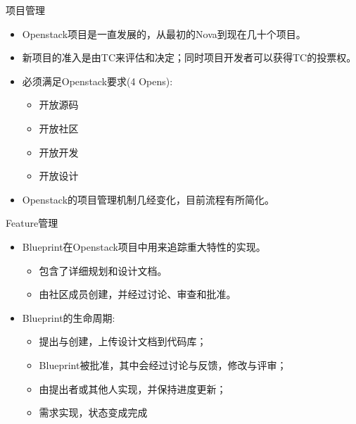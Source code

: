 \documentclass{beamer}
\begin{document}
\begin{frame}[label={sec:org45f7cc4}]{项目管理}
\begin{itemize}
\item Openstack项目是一直发展的，从最初的Nova到现在几十个项目。
\item 新项目的准入是由TC来评估和决定；同时项目开发者可以获得TC的投票权。
\item 必须满足Openstack要求(4 Opens):
\begin{itemize}
\item 开放源码
\item 开放社区
\item 开放开发
\item 开放设计
\end{itemize}
\item Openstack的项目管理机制几经变化，目前流程有所简化。
\end{itemize}
\end{frame}

\begin{frame}[label={sec:orgf9e0d31}]{Feature管理}
\begin{itemize}
\item Blueprint在Openstack项目中用来追踪重大特性的实现。
\begin{itemize}
\item 包含了详细规划和设计文档。
\item 由社区成员创建，并经过讨论、审查和批准。
\end{itemize}
\item Blueprint的生命周期:
\begin{itemize}
\item 提出与创建，上传设计文档到代码库；
\item Blueprint被批准，其中会经过讨论与反馈，修改与评审；
\item 由提出者或其他人实现，并保持进度更新；
\item 需求实现，状态变成完成
\end{itemize}
\end{itemize}
\end{frame}
\end{document}
